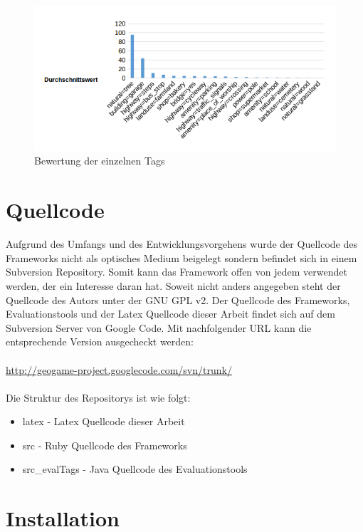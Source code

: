 \begin{figure}[H]
\begin{center}
\includegraphics[width=150mm]{images/ch8_valued3.png}
\caption{Bewertung der einzelnen Tags}
\label{img:ch8_valued3}
\end{center}
\end{figure}

\newpage

\section{Quellcode}

Aufgrund des Umfangs und des Entwicklungsvorgehens wurde der Quellcode des Frameworks nicht als optisches Medium beigelegt sondern befindet sich in einem Subversion Repository.
Somit kann das Framework offen von jedem verwendet werden, der ein Interesse daran hat. Soweit nicht anders angegeben steht der Quellcode des Autors unter der GNU GPL v2.
Der Quellcode des Frameworks, Evaluationstools und der Latex Quellcode dieser Arbeit findet sich auf dem Subversion Server von Google Code.
Mit nachfolgender URL kann die entsprechende Version ausgecheckt werden:\\\\
\url{http://geogame-project.googlecode.com/svn/trunk/}\\\\

Die Struktur des Repositorys ist wie folgt:
\begin{itemize}
\item latex - Latex Quellcode dieser Arbeit
\item src - Ruby Quellcode des Frameworks
\item src\_evalTags - Java Quellcode des Evaluationstools
\end{itemize}

\section{Installation}

